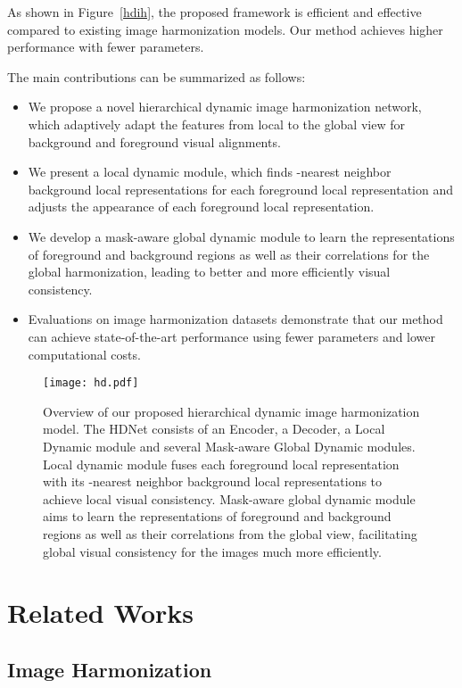 \documentclass[sigconf]{acmart}
\begin{document}
As shown in Figure~\ref{hdih}, the proposed framework is efficient and effective compared to existing image harmonization models. Our method achieves higher performance with fewer parameters.

The main contributions can be summarized as follows:
\begin{itemize}
	\item We propose a novel hierarchical dynamic image harmonization network, which adaptively adapt the features from local to the global view for background and foreground visual alignments. 
	
	\item We present a local dynamic module, which finds -nearest neighbor background local representations for each foreground local representation and adjusts the appearance of each foreground local representation.
	
	\item We develop a mask-aware global dynamic module to learn the representations of foreground and background regions as well as their correlations for the global harmonization, leading to better and more efficiently visual consistency.
	
	\item Evaluations on image harmonization datasets demonstrate that our method can achieve state-of-the-art performance using fewer parameters and lower computational costs.
\end{itemize}

\begin{figure*}[t]
	\centering
	\texttt{[image: hd.pdf]}
	\caption{Overview of our proposed hierarchical dynamic image harmonization model. The HDNet consists of an Encoder, a Decoder, a Local Dynamic module and several Mask-aware Global Dynamic modules. Local dynamic module fuses each foreground local representation with its -nearest neighbor background local representations to achieve local visual consistency. Mask-aware global dynamic module aims to learn the representations of foreground and background regions as well as their correlations from the global view, facilitating global visual consistency for the images much more efficiently.}
\end{figure*}


\section{Related Works}
\subsection{Image Harmonization}
\end{document}
